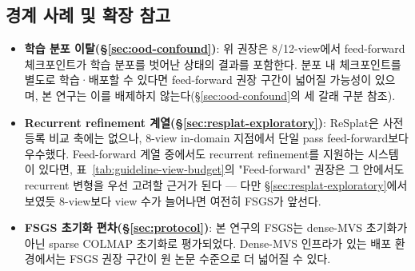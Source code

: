 \subsection{경계 사례 및 확장 참고}
\label{sec:guideline-caveats}

\begin{itemize}
  \item \textbf{학습 분포 이탈(\S\ref{sec:ood-confound})}: 위 권장은 8/12-view에서 feed-forward 체크포인트가 학습 분포를 벗어난 상태의 결과를 포함한다. 분포 내 체크포인트를 별도로 학습·배포할 수 있다면 feed-forward 권장 구간이 넓어질 가능성이 있으며, 본 연구는 이를 배제하지 않는다(\S\ref{sec:ood-confound}의 세 갈래 구분 참조).
  \item \textbf{Recurrent refinement 계열(\S\ref{sec:resplat-exploratory})}: ReSplat은 사전 등록 비교 축에는 없으나, 8-view in-domain 지점에서 단일 pass feed-forward보다 우수했다. Feed-forward 계열 중에서도 recurrent refinement를 지원하는 시스템이 있다면, 표~\ref{tab:guideline-view-budget}의 "Feed-forward" 권장은 그 안에서도 recurrent 변형을 우선 고려할 근거가 된다 — 다만 \S\ref{sec:resplat-exploratory}에서 보였듯 8-view보다 view 수가 늘어나면 여전히 FSGS가 앞선다.
  \item \textbf{FSGS 초기화 편차(\S\ref{sec:protocol})}: 본 연구의 FSGS는 dense-MVS 초기화가 아닌 sparse COLMAP 초기화로 평가되었다. Dense-MVS 인프라가 있는 배포 환경에서는 FSGS 권장 구간이 원 논문 수준으로 더 넓어질 수 있다.
\end{itemize}
